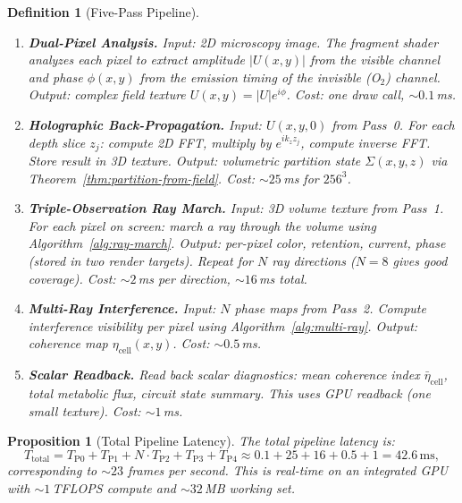 \documentclass[11pt,twocolumn,a4paper]{article}
\newtheorem{proposition}[theorem]{Proposition}
\newtheorem{definition}[theorem]{Definition}
\newcommand{\etacell}{\eta_{\mathrm{cell}}}
\begin{document}
\begin{definition}[Five-Pass Pipeline]
\label{def:pipeline}
\begin{enumerate}[label=\textbf{Pass~\arabic*:},leftmargin=*]
\item[\textbf{Pass 0:}] \textbf{Dual-Pixel Analysis.}
  Input: 2D microscopy image. The fragment shader analyzes each pixel
  to extract amplitude $|U(x,y)|$ from the visible channel and phase
  $\phi(x,y)$ from the emission timing of the invisible (O$_2$)
  channel. Output: complex field texture $U(x,y) = |U| e^{i\phi}$.
  Cost: one draw call, $\sim\!0.1$\,ms.

\item[\textbf{Pass 1:}] \textbf{Holographic Back-Propagation.}
  Input: $U(x,y,0)$ from Pass~0. For each depth slice $z_j$: compute
  2D FFT, multiply by $e^{ik_z z_j}$, compute inverse FFT. Store
  result in 3D texture. Output: volumetric partition state
  $\Sigma(x,y,z)$ via Theorem~\ref{thm:partition-from-field}. Cost:
  $\sim\!25$\,ms for $256^3$.

\item[\textbf{Pass 2:}] \textbf{Triple-Observation Ray March.}
  Input: 3D volume texture from Pass~1. For each pixel on screen:
  march a ray through the volume using
  Algorithm~\ref{alg:ray-march}. Output: per-pixel color,
  retention, current, phase (stored in two render targets).
  Repeat for $N$ ray directions ($N = 8$ gives good coverage). Cost:
  $\sim\!2$\,ms per direction, $\sim\!16$\,ms total.

\item[\textbf{Pass 3:}] \textbf{Multi-Ray Interference.}
  Input: $N$ phase maps from Pass~2. Compute interference visibility
  per pixel using Algorithm~\ref{alg:multi-ray}. Output: coherence
  map $\etacell(x,y)$. Cost: $\sim\!0.5$\,ms.

\item[\textbf{Pass 4:}] \textbf{Scalar Readback.}
  Read back scalar diagnostics: mean coherence index
  $\bar{\eta}_{\mathrm{cell}}$, total metabolic flux, circuit state
  summary. This uses GPU readback (one small texture). Cost:
  $\sim\!1$\,ms.
\end{enumerate}
\end{definition}

\begin{proposition}[Total Pipeline Latency]
\label{prop:latency}
The total pipeline latency is:
\begin{equation}
T_{\mathrm{total}} = T_{\mathrm{P0}} + T_{\mathrm{P1}}
  + N \cdot T_{\mathrm{P2}} + T_{\mathrm{P3}} + T_{\mathrm{P4}}
  \approx 0.1 + 25 + 16 + 0.5 + 1 = 42.6\,\text{ms},
\label{eq:total-latency}
\end{equation}
corresponding to $\sim\!23$ frames per second. This is real-time on an
integrated GPU with $\sim\!1$\,TFLOPS compute and $\sim\!32$\,MB
working set.
\end{proposition}
\end{document}
